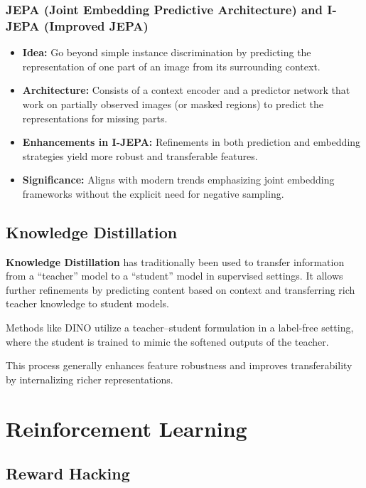 \documentclass{article}
\begin{document}
\subsubsection{JEPA (Joint Embedding Predictive Architecture) and I-JEPA (Improved JEPA)}
\begin{itemize}
    \item \textbf{Idea:} Go beyond simple instance discrimination by predicting the representation of one part of an image from its surrounding context.
    \item \textbf{Architecture:} Consists of a context encoder and a predictor network that work on partially observed images (or masked regions) to predict the representations for missing parts.
    \item \textbf{Enhancements in I-JEPA:} Refinements in both prediction and embedding strategies yield more robust and transferable features.
    \item \textbf{Significance:} Aligns with modern trends emphasizing joint embedding frameworks without the explicit need for negative sampling.
\end{itemize}

\subsection{Knowledge Distillation}

\textbf{Knowledge Distillation} has traditionally been used to transfer information from a “teacher” model to a “student” model in supervised settings. It allows further refinements by predicting content based on context and transferring rich teacher knowledge to student models.

Methods like DINO utilize a teacher--student formulation in a label-free setting, where the student is trained to mimic the softened outputs of the teacher.

This process generally enhances feature robustness and improves transferability by internalizing richer representations.

\clearpage\newpage

\section{Reinforcement Learning}

\subsection{Reward Hacking}
\end{document}
